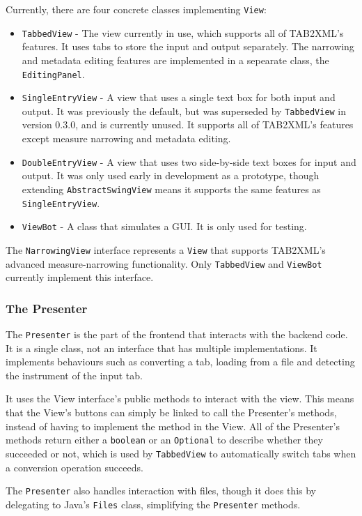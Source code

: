 \documentclass[11pt]{article}
\begin{document}
Currently, there are four concrete classes implementing \texttt{View}:
\begin{itemize}
\item \texttt{TabbedView} - The view currently in use, which supports all of TAB2XML's features.  It uses tabs to store the input and output separately.  The narrowing and metadata editing features are implemented in a sepearate class, the \texttt{EditingPanel}.
\item \texttt{SingleEntryView} - A view that uses a single text box for both input and output.  It was previously the default, but was superseded by \texttt{TabbedView} in version 0.3.0, and is currently unused.  It supports all of TAB2XML's features except measure narrowing and metadata editing.
\item \texttt{DoubleEntryView} - A view that uses two side-by-side text boxes for input and output.  It was only used early in development as a prototype, though extending \texttt{AbstractSwingView} means it supports the same features as \texttt{SingleEntryView}.
\item \texttt{ViewBot} - A class that simulates a GUI.  It is only used for testing.
\end{itemize}

The \texttt{NarrowingView} interface represents a \texttt{View} that supports TAB2XML's advanced measure-narrowing functionality.  Only \texttt{TabbedView} and \texttt{ViewBot} currently implement this interface.
\subsubsection{The Presenter}
\label{sec:org1d7e879}
The \texttt{Presenter} is the part of the frontend that interacts with the backend code.  It is a single class, not an interface that has multiple implementations.  It implements behaviours such as converting a tab, loading from a file and detecting the instrument of the input tab.

It uses the View interface's public methods to interact with the view.  This means that the View's buttons can simply be linked to call the Presenter's methods, instead of having to implement the method in the View.  All of the Presenter's methods return either a \texttt{boolean} or an \texttt{Optional} to describe whether they succeeded or not, which is used by \texttt{TabbedView} to automatically switch tabs when a conversion operation succeeds.

The \texttt{Presenter} also handles interaction with files, though it does this by delegating to Java's \texttt{Files} class, simplifying the \texttt{Presenter} methods.
\end{document}
